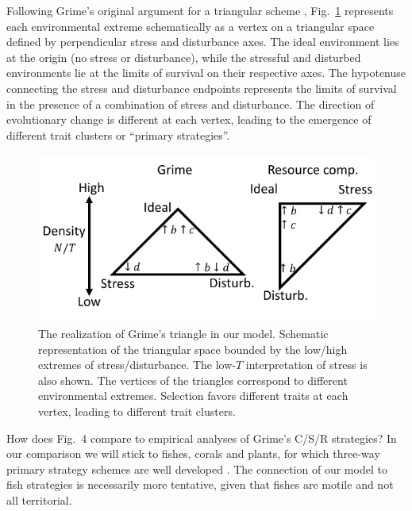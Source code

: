\documentclass[11pt]{article}
\begin{document}
Following Grime's original argument for a triangular scheme \citep{grime_1977}, Fig.~\ref{fig:axes} represents each environmental extreme schematically as a vertex on a triangular space defined by perpendicular stress and disturbance axes. The ideal environment lies at the origin (no stress or disturbance), while the stressful and disturbed environments lie at the limits of survival on their respective axes. The hypotenuse connecting the stress and disturbance endpoints represents the limits of survival in the presence of a combination of stress and disturbance. The direction of evolutionary change is different at each vertex, leading to the emergence of different trait clusters or ``primary strategies''. 

\begin{figure}
\centering
\includegraphics[scale=1]{axes.pdf}
\caption{\label{fig:axes} The realization of Grime's triangle in our model. Schematic representation of the triangular space bounded by the low/high extremes of stress/disturbance. The low-$T$ interpretation of stress is also shown. The vertices of the triangles correspond to different environmental extremes. Selection favors different traits at each vertex, leading to different trait clusters.} 
\end{figure}

How does Fig.~4 compare to empirical analyses of Grime's C/S/R strategies? In our comparison we will stick to fishes, corals and plants, for which three-way primary strategy schemes are well developed \citep{grime_1977,winemiller_1992,darling_2012}. The connection of our model to fish strategies is necessarily more tentative, given that fishes are motile and not all territorial. 
\end{document}
